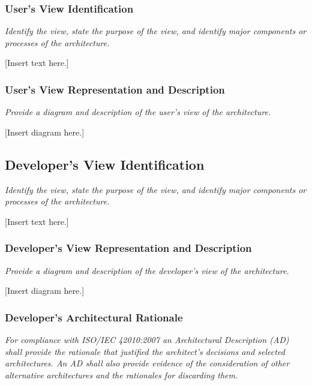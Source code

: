 \documentclass[twoside,letterpaper]{article}
\begin{document}
\subsubsection{User{\textquoteright}s View Identification}
{\itshape\color{black}
Identify the view, state the purpose of the view, and identify major
components or processes of the architecture.}

{\color{black}
[Insert text here.]}

\subsubsection{User{\textquoteright}s View Representation and
Description }
{\itshape\color{black}
Provide a diagram and description of the user{\textquoteright}s view of
the architecture.}

{\color{black}
[Insert diagram here.]}

\subsection[Developer{\textquoteright}s View
Identification]{\bfseries\color{black}
Developer{\textquoteright}s View Identification}
{\itshape\color{black}
Identify the view, state the purpose of the view, and identify major
components or processes of the architecture.}

{\color{black}
[Insert text here.]}

\subsubsection[Developer{\textquoteright}s View Representation and
Description ]{Developer{\textquoteright}s View Representation and
Description }
{\itshape\color{black}
Provide a diagram and description of the developer{\textquoteright}s
view of the architecture.}

{\color{black}
[Insert diagram here.]}

\subsubsection{Developer{\textquoteright}s Architectural Rationale}
{\itshape\color{black}
For compliance with ISO/IEC 42010:2007 an Architectural
Description (AD) shall provide the rationale that justified the
architect{\textquoteright}s decisions and selected architectures. An AD
shall also provide evidence of the consideration of other alternative
architectures and the rationales for discarding them.}
\end{document}

